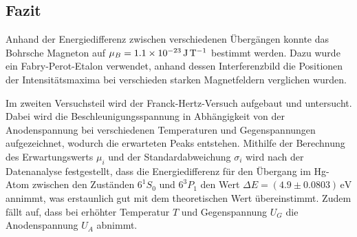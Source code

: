 \documentclass{article}
\begin{document}
\begin{multicols}{2}
\section{Fazit}
Anhand der Energiedifferenz zwischen verschiedenen Übergängen konnte das Bohrsche Magneton auf $\mu_B = \SI{1.1e-23}{\J\per\T}$ bestimmt
werden. Dazu wurde ein Fabry-Perot-Etalon verwendet, anhand dessen Interferenzbild die Positionen der Intensitätsmaxima
bei verschieden starken Magnetfeldern verglichen wurden.

Im zweiten Versuchsteil wird der Franck-Hertz-Versuch aufgebaut und untersucht. Dabei 
wird die Beschleunigungsspannung in Abhängigkeit von der Anodenspannung bei verschiedenen 
Temperaturen und Gegenspannungen aufgezeichnet, wodurch die erwarteten Peaks entstehen. 
Mithilfe der Berechnung des Erwartungswerts $\mu_i$ und der Standardabweichung $\sigma_i$ 
wird nach der Datenanalyse festgestellt, dass die Energiedifferenz für den Übergang im 
Hg-Atom zwischen den Zuständen $6^1S_0$ und $6^3P_1$ den Wert $\Delta E = (4.9 \pm 0.0803) \, 
\text{eV}$ annimmt, was erstaunlich gut mit dem theoretischen Wert übereinstimmt. Zudem 
fällt auf, dass bei erhöhter Temperatur $T$ und Gegenspannung $U_G$ die Anodenspannung $U_A$ abnimmt.





\clearpage

\end{multicols}
\end{document}

